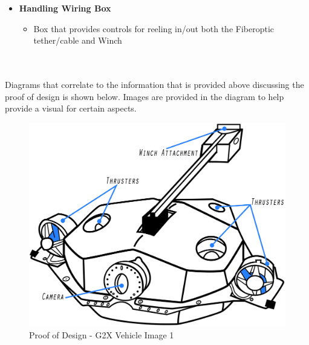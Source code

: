 \documentclass[12pt]{article}
\begin{document}
{{\begin{itemize}
\begin{itemize}
\begin{itemize}
						\item Reeled in/out via the Handling Wiring Box
					\end{itemize}
					\item[] \textbf{Handling Wiring Box}
					\begin{itemize}
						\item Box that provides controls for reeling in/out both the Fiberoptic tether/cable and Winch
					\end{itemize}
				\end{itemize}
			\end{itemize}
		}
	
		\noindent \\\\Diagrams that correlate to the information that is provided above discussing the proof of design is shown below. Images are provided in the diagram to help provide a visual for certain aspects.

		\begin{figure}[!htb]
			\centering
			\includegraphics[width = 120mm]{assets/basic_sub.jpg}
			\caption{Proof of Design - G2X Vehicle Image 1 \label{overflow}}
		\end{figure}
	
}
\end{document}

